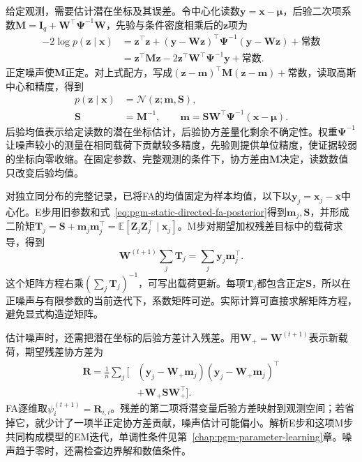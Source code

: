 给定观测，需要估计潜在坐标及其误差。令中心化读数$\bm y=\bm x-\bm\mu$，后验二次项系数$\bm M=\bm I_q+\bm W^\top\bm\Psi^{-1}\bm W$，先验与条件密度相乘后的$\bm z$项为
\[
  \begin{aligned}
    -2\log p(\bm{z}\mid\bm{x})
      &=\bm{z}^{\top}\bm{z}
       +(\bm{y}-\bm{W}\bm{z})^{\top}
          \bm{\Psi}^{-1}(\bm{y}-\bm{W}\bm{z})
       +\text{常数}\\
      &=\bm{z}^{\top}\bm{M}\bm{z}
       -2\bm{z}^{\top}\bm{W}^{\top}\bm{\Psi}^{-1}\bm{y}
       +\text{常数}.
  \end{aligned}
\]
正定噪声使$\bm M$正定。对上式配方，写成$(\bm z-\bm m)^\top\bm M(\bm z-\bm m)+\text{常数}$，读取高斯中心和精度，得到
\begin{equation}
  \label{eq:pgm-static-directed-fa-posterior}
  \begin{aligned}
    p(\bm{z}\mid\bm{x})&=\mathcal{N}(\bm{z};\bm{m},\bm{S}),\\
    \bm{S}&=\bm{M}^{-1},\qquad
    \bm{m}=\bm{S}\bm{W}^{\top}\bm{\Psi}^{-1}
                  (\bm{x}-\bm{\mu}).
  \end{aligned}
\end{equation}
后验均值表示给定读数的潜在坐标估计，后验协方差量化剩余不确定性。权重$\bm\Psi^{-1}$让噪声较小的测量在相同载荷下贡献较多精度，先验则提供单位精度，使证据较弱的坐标向零收缩。在固定参数、完整观测的条件下，协方差由$\bm M$决定，读数数值只改变后验均值。

对独立同分布的完整记录，已将FA的均值固定为样本均值，以下以$\bm y_j=\bm x_j-\overline{\bm x}$中心化。E步用旧参数和式~\eqref{eq:pgm-static-directed-fa-posterior}得到$\bm m_j,\bm S$，并形成二阶矩$\bm T_j=\bm S+\bm m_j\bm m_j^\top=\mathbb E[\bm Z_j\bm Z_j^\top\mid\bm x_j]$。M步对期望加权残差目标中的载荷求导，得到
\[
  \bm{W}^{(t+1)}\sum_j\bm{T}_j
     =\sum_j\bm{y}_j\bm{m}_j^\top.
\]
这个矩阵方程右乘$\left(\sum_j\bm T_j\right)^{-1}$，可写出载荷更新。每项$\bm T_j$都包含正定$\bm S$，所以在正噪声与有限参数的当前迭代下，系数矩阵可逆。实际计算可直接求解矩阵方程，避免显式构造逆矩阵。

估计噪声时，还需把潜在坐标的后验方差计入残差。用$\bm W_+=\bm W^{(t+1)}$表示新载荷，期望残差协方差为
\begin{equation}
  \label{eq:pgm-static-directed-fa-residual}
  \begin{aligned}
    \bm{R}=\frac1n\sum_j\bigl[
      &(\bm{y}_j-\bm{W}_{+}\bm{m}_j)
       (\bm{y}_j-\bm{W}_{+}\bm{m}_j)^\top\\
      &+\bm{W}_{+}\bm{S}\bm{W}_{+}^\top
    \bigr].
  \end{aligned}
\end{equation}
FA逐维取$\psi_i^{(t+1)}=\bm R_{i,i}$。残差的第二项将潜变量后验方差映射到观测空间；若省掉它，就少计了一项半正定协方差贡献，噪声估计可能偏小。解析E步和这项M步共同构成模型的EM迭代，单调性条件见第~\ref{chap:pgm-parameter-learning}章。噪声趋于零时，还需检查边界解和数值条件。

